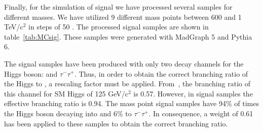 Finally, for the simulation of signal we have processed several samples for different \Tp masses. We have utilized 9 different mass points between 600 \GeVcc and 1 TeV/$\text{c}^{2}$ in steps of 50 \GeVcc. The processed signal samples are shown in table~\ref{tab:MCsig}. These samples were generated with MadGraph 5 and Pythia 6.

\begin{table*}[htbH]
\begin{center}
\caption{List of Monte-Carlo signal samples used in the analysis, their corresponding cross-section and mass of the $T$.\label{tab:MCsig}}
\end{center}
\end{table*}

The signal samples have been produced with only two decay channels for the Higgs boson: \bbbar and $\tau^{-}\tau^{+}$. Thus, in order to obtain the correct branching ratio of the Higgs to \bbbar, a rescaling factor must be applied. From~\cite{Heinemeyer:2013tqa}, the branching ratio of this channel for SM Higgs of 125 GeV/$\text{c}^{2}$ is 0.57. However, in signal samples the effective branching ratio is 0.94. The mass point signal samples have 94\% of times the Higgs boson decaying into \bbbar and 6\% to $\tau^{-}\tau^{+}$. In consequence, a weight of 0.61 has been applied to these samples to obtain the correct branching ratio. %

